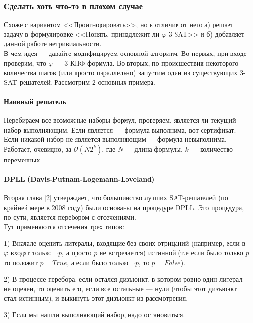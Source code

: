 \documentclass[paper=a4, fontsize=11pt]{scrartcl}
\begin{document}
\subsubsection{Сделать хоть что-то в плохом случае}

Схоже с вариантом <<Проигнорировать>>, но в отличие от него а) решает задачу
в формулировке <<Понять, принадлежит ли $\varphi$ 3-SAT>> и б) добавляет данной
работе нетривиальности. \\

В чем идея --- давайте модифицируем основной алгоритм. Во-первых, при входе
проверим, что $\varphi$ --- 3-КНФ формула. Во-вторых, по происшествии некоторого
количества шагов (или просто параллельно) запустим один из
существующих 3-SAT-решателей. Рассмотрим 2 основных примера.\\


\paragraph{Наивный решатель}

Перебираем все возможные наборы формул, проверяем, является ли текущий набор
выполняющим. Если является --- формула выполнима, вот сертификат. Если никакой
набор не является выполняющим --- формула невыполнима. Работает, очевидно,
за $\mathcal{O}(N2^k)$, где $N$ --- длина формулы, $k$ ---
количество переменных\\


\paragraph{DPLL (Davis-Putnam-Logemann-Loveland)}
Вторая глава [2] утверждает, что большинство лучших SAT-решателей (по крайней
мере в 2008 году) были основаны на процедуре DPLL. Это процедура, по сути,
является перебором с отсечениями. \\

Тут применяются отсечения трех типов:

1) Вначале оценить литералы, входящие без
своих отрицаний (например, если в $\varphi$ входят только $\neg p$, а просто
$p$ не встречается) истинной (т.е если было только $p$ то положит $p=True$, а
если было только $\neg p$, то $p=False$).

2) В процессе перебора, если остался дизъюнкт, в котором ровно один литерал
не оценен, то оценить его, если все остальные --- нули (чтобы этот дизъюнкт
стал истинным), и выкинуть этот дизъюнкт из рассмотрения.

3) Если мы нашли выполняющий набор, надо остановиться.
\end{document}
